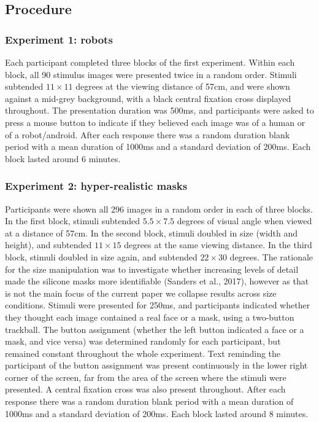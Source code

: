 \documentclass[
]{article}
\begin{document}
\hypertarget{procedure}{%
\subsection{Procedure}\label{procedure}}

\hypertarget{experiment-1-robots}{%
\subsubsection{Experiment 1: robots}\label{experiment-1-robots}}

Each participant completed three blocks of the first experiment. Within each block, all 90 stimulus images were presented twice in a random order. Stimuli subtended \(11\times11\) degrees at the viewing distance of 57cm, and were shown against a mid-grey background, with a black central fixation cross displayed throughout. The presentation duration was 500ms, and participants were asked to press a mouse button to indicate if they believed each image was of a human or of a robot/android. After each response there was a random duration blank period with a mean duration of 1000ms and a standard deviation of 200ms. Each block lasted around 6 minutes.

\hypertarget{experiment-2-hyper-realistic-masks}{%
\subsubsection{Experiment 2: hyper-realistic masks}\label{experiment-2-hyper-realistic-masks}}

Participants were shown all 296 images in a random order in each of three blocks. In the first block, stimuli subtended \(5.5\times7.5\) degrees of visual angle when viewed at a distance of 57cm. In the second block, stimuli doubled in size (width and height), and subtended \(11\times15\) degrees at the same viewing distance. In the third block, stimuli doubled in size again, and subtended \(22\times30\) degrees. The rationale for the size manipulation was to investigate whether increasing levels of detail made the silicone masks more identifiable (Sanders et al., 2017), however as that is not the main focus of the current paper we collapse results across size conditions. Stimuli were presented for 250ms, and participants indicated whether they thought each image contained a real face or a mask, using a two-button trackball. The button assignment (whether the left button indicated a face or a mask, and vice versa) was determined randomly for each participant, but remained constant throughout the whole experiment. Text reminding the participant of the button assignment was present continuously in the lower right corner of the screen, far from the area of the screen where the stimuli were presented. A central fixation cross was also present throughout. After each response there was a random duration blank period with a mean duration of 1000ms and a standard deviation of 200ms. Each block lasted around 8 minutes.
\end{document}
